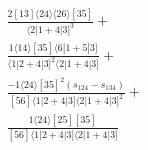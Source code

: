 \documentclass[varwidth, border=5pt]{standalone}
\begin{document}
\begin{my}
$\begin{gathered}
\scriptscriptstyle\frac{2[13]⟨24⟩⟨26⟩[35]}{⟨2|1+4|3]^3}+\\
\scriptscriptstyle\frac{1⟨14⟩[35]⟨6|1+5|3]}{⟨1|2+4|3]^2⟨2|1+4|3]}+\\
\scriptscriptstyle\frac{-1⟨24⟩[35]^2(s_{124}-s_{134})}{[56]⟨1|2+4|3]⟨2|1+4|3]^2}+\\
\scriptscriptstyle\frac{1⟨24⟩[25][35]}{[56]⟨1|2+4|3]⟨2|1+4|3]}\phantom{+}
\end{gathered}$
\end{my}
\end{document}
